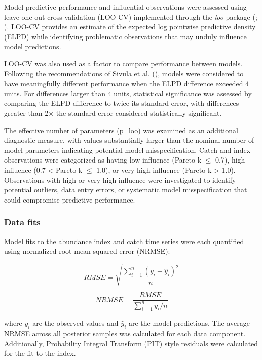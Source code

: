 \documentclass[
  11pt,
]{SCreport}
\begin{document}
Model predictive performance and influential observations were assessed
using leave-one-out cross-validation (LOO-CV) implemented through the
\emph{loo} package (; ).
LOO-CV provides an estimate of the expected log pointwise predictive
density (ELPD) while identifying problematic observations that may
unduly influence model predictions.

LOO-CV was also used as a factor to compare performance between models.
Following the recommendations of Sivula et al.
(), models were considered
to have meaningfully different performance when the ELPD difference
exceeded 4 units. For differences larger than 4 units, statistical
significance was assessed by comparing the ELPD difference to twice its
standard error, with differences greater than 2\(\times\) the standard
error considered statistically significant.

The effective number of parameters (p\_loo) was examined as an
additional diagnostic measure, with values substantially larger than the
nominal number of model parameters indicating potential model
misspecification. Catch and index observations were categorized as
having low influence (Pareto-k \(\leq\) 0.7), high influence (0.7
\textless{} Pareto-k \(\leq\) 1.0), or very high influence (Pareto-k
\textgreater{} 1.0). Observations with high or very-high influence were
investigated to identify potential outliers, data entry errors, or
systematic model misspecification that could compromise predictive
performance.

\subsubsection{Data fits}\label{sec-data-fits}

Model fits to the abundance index and catch time series were each
quantified using normalized root-mean-squared error (NRMSE):

\[RMSE = \sqrt{\frac{\sum_{i=1}^{n} (y_i - \hat{y}_i)^2}{n}}\]

\[NRMSE = \frac{RMSE}{\sum_{i=1}^{n} y_i / n}\]

where \(y_i\) are the observed values and \(\hat{y}_i\) are the model
predictions. The average NRMSE across all posterior samples was
calculated for each data component. Additionally, Probability Integral
Transform (PIT) style residuals were calculated for the fit to the
index.
\end{document}
